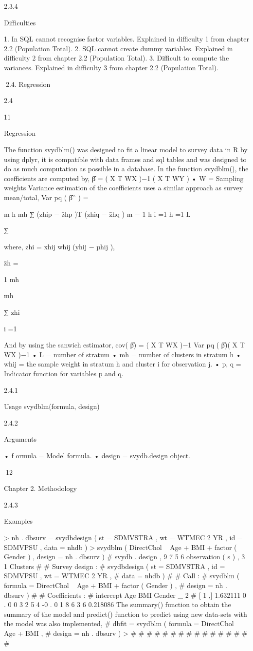 2.3.4

Difficulties

1. In SQL cannot recognise factor variables. Explained in difficulty 1 from chapter
2.2 (Population Total).
2. SQL cannot create dummy variables. Explained in difficulty 2 from chapter 2.2
(Population Total).
3. Difficult to compute the variances. Explained in difficulty 3 from chapter 2.2
(Population Total).

2.4. Regression

2.4

11

Regression

The function svydblm() was designed to fit a linear model to survey data in R by
using dplyr, it is compatible with data frames and sql tables and was designed to do
as much computation as possible in a database.
In the function svydblm(), the coefficients are computed by,
β̂ = ( X T WX )−1 ( X T WY )
• W = Sampling weights
Variance estimation of the coefficients uses a similar approach as survey mean/total,
Var pq ( β̂ˆ ) =

m h mh
∑ (zhip − z̄hp )T (zhiq − z̄hq )
m
−
1
h
i =1
h =1
L

∑

where,
zhi = xhij whij (yhij − µhij ),

z̄h =

1
mh

mh

∑ zhi

i =1

And by using the sanwich estimator,
cov( β̂) = ( X T WX )−1 Var pq ( β̂)( X T WX )−1
• L = number of stratum
• mh = number of clusters in stratum h
• whij = the sample weight in stratum h and cluster i for observation j.
• p, q = Indicator function for variables p and q.

2.4.1

Usage
svydblm(formula, design)

2.4.2

Arguments

• f ormula = Model formula.
• design = svydb.design object.

12

Chapter 2. Methodology

2.4.3

Examples

> nh . dbsurv = svydbdesign ( st = SDMVSTRA , wt = WTMEC 2 YR ,
id = SDMVPSU , data = nhdb )
> svydblm ( DirectChol ~ Age + BMI + factor ( Gender ) ,
design = nh . dbsurv )
# svydb . design , 9 7 5 6 observation ( s ) , 3 1 Clusters
#
# Survey design :
# svydbdesign ( st = SDMVSTRA , id = SDMVPSU , wt = WTMEC 2 YR ,
#
data = nhdb )
#
# Call :
# svydblm ( formula = DirectChol ~ Age + BMI + factor ( Gender ) ,
#
design = nh . dbsurv )
#
# Coefficients :
#
intercept Age
BMI
Gender _ 2
# [ 1 ,]
1.632111
0 . 0 0 3 2 5 4 -0 . 0 1 8 6 3 6
0.218086
The summary() function to obtain the summary of the model and predict() function to predict using new data-sets with the model was also implemented,
# dbfit = svydblm ( formula = DirectChol ~ Age + BMI ,
#
design = nh . dbsurv )
>
#
#
#
#
#
#
#
#
#
#
#
#
#
#
#
#

